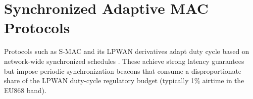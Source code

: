 \section{Synchronized Adaptive MAC Protocols}
Protocols such as S-MAC and its LPWAN derivatives adapt duty cycle based on network-wide
synchronized schedules \cite{ye2004smac}. These achieve strong latency guarantees but impose
periodic synchronization beacons that consume a disproportionate share of the LPWAN duty-cycle
regulatory budget (typically 1\% airtime in the EU868 band).
